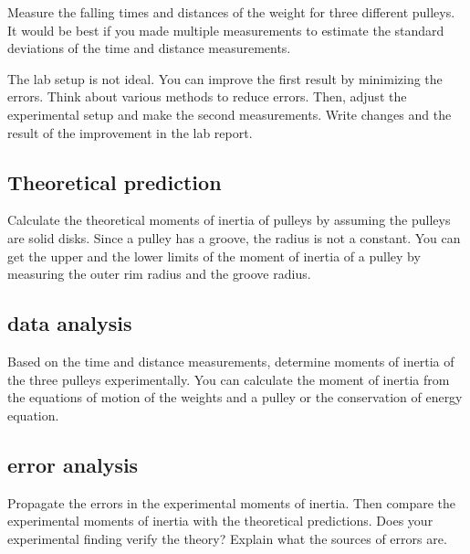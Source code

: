 

Measure the falling times and distances of the weight for three different pulleys. It would be best if you made multiple measurements to estimate the standard deviations of the time and distance measurements. 

The lab setup is not ideal. You can improve the first result by minimizing the errors. Think about various methods to reduce errors. Then, adjust the experimental setup and make the second measurements. Write changes and the result of the improvement in the lab report. 

\analysis

\subsection*{Theoretical prediction}
Calculate the theoretical moments of inertia of pulleys by assuming the pulleys are solid disks. Since a pulley has a groove, the radius is not a constant. You can get the upper and the lower limits of the moment of inertia of a pulley by measuring the outer rim radius and the groove radius. 

\subsection*{data analysis}
Based on the time and distance measurements, determine moments of inertia of the three pulleys experimentally. You can calculate the moment of inertia from the equations of motion of the weights and a pulley or the conservation of energy equation. 

\subsection*{error analysis}
Propagate the errors in the experimental moments of inertia. Then compare the experimental moments of inertia with the theoretical predictions. 
Does your experimental finding verify the theory? Explain what the sources of errors are. 

\prelab 
